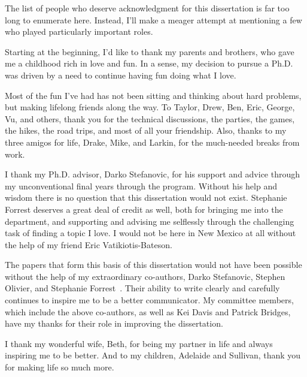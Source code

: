 \documentclass[botnum,letterpaper]{unmeethesis}
\begin{document}
\begin{acknowledgments}
  \vspace{1.1in}
  The list of people who deserve acknowledgment for this dissertation is far too
  long to enumerate here. Instead, I'll make a meager attempt at mentioning a
  few who played particularly important roles. 

  Starting at the beginning, I'd like to thank my parents and brothers, who gave
  me a childhood rich in love and fun. In a sense, my decision to pursue a Ph.D.
  was driven by a need to continue having fun doing what I love.  

  Most of the fun I've had has not been sitting and thinking about hard
  problems, but making lifelong friends along the way. To Taylor, Drew, Ben,
  Eric, George, Vu, and others, thank you for the technical discussions, the
  parties, the games, the hikes, the road trips, and most of all your
  friendship. Also, thanks to my three amigos for life, Drake, Mike, and Larkin,
  for the much-needed breaks from work. 

  I thank my Ph.D. advisor, Darko Stefanovic, for his support and advice through
  my unconventional final years through the program. Without his help and
  wisdom there is no question that this dissertation would not exist. Stephanie
  Forrest deserves a great deal of credit as well, both for bringing me into the
  department, and supporting and advising me selflessly through the challenging
  task of finding a topic I love. I would not be here in New Mexico at all
  without the help of my friend Eric Vatikiotis-Bateson. 

  The papers that form this basis of this dissertation would not have been
  possible without the help of my extraordinary co-authors, Darko Stefanovic,
  Stephen Olivier, and Stephanie Forrest~\cite{cem, verifiably}. Their
  ability to write clearly and carefully continues to inspire me to be a better
  communicator. My committee members, which include the above co-authors, as
  well as Kei Davis and Patrick Bridges, have my thanks for their role in
  improving the dissertation. 

  I thank my wonderful wife, Beth, for being my partner in life and always
  inspiring me to be better. And to my children, Adelaide and Sullivan, thank
  you for making life so much more.
\end{acknowledgments}
\setlength{\footskip}{20pt}

\maketitleabstract %
\end{document}

